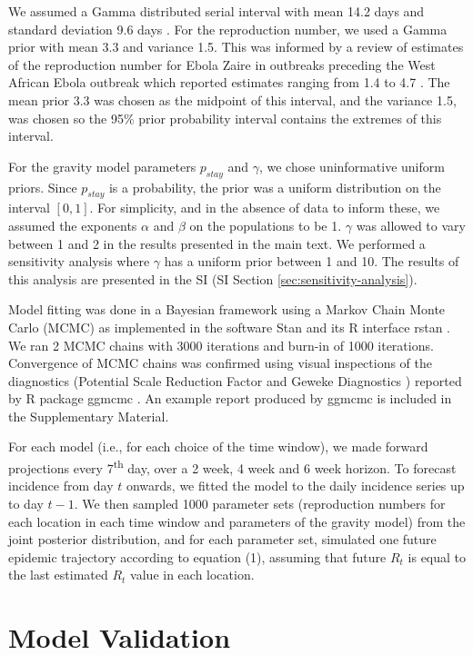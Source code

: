 \documentclass[9pt,twocolumn,twoside,lineno]{pnas-new}
\begin{document}
{We assumed a Gamma distributed serial interval with mean 14.2 days and
standard deviation 9.6 days \cite{team2015west}. For the reproduction
number, we used a Gamma prior with mean 3.3 and variance 1.5. This was
informed by a review of estimates of the reproduction number for Ebola
Zaire in outbreaks preceding the West African Ebola outbreak which
reported estimates ranging from 1.4 to 4.7 \cite{van2015review}. The
mean prior 3.3 was chosen as the midpoint of this interval, and the
variance 1.5, was chosen so the 95\% prior probability interval contains
the extremes of this interval.

For the gravity model parameters \(p_{stay}\) and \(\gamma\), we chose
uninformative uniform priors. Since \(p_{stay}\) is a probability, the
prior was a uniform distribution on the interval \([0, 1]\). For
simplicity, and in the absence of data to inform these, we assumed the
exponents \(\alpha\) and \(\beta\) on the populations to be 1.
\(\gamma\) was allowed to vary between 1 and 2 in the results presented
in the main text. We performed a sensitivity analysis where \(\gamma\)
has a uniform prior between 1 and 10. The results of this analysis are
presented in the SI (SI Section \ref{sec:sensitivity-analysis}).

Model fitting was done in a Bayesian framework using a Markov Chain
Monte Carlo (MCMC) as implemented in the software Stan
\cite{carpenter2017stan} and its R interface rstan \cite{rstan}. We ran
2 MCMC chains with 3000 iterations and burn-in of 1000 iterations.
Convergence of MCMC chains was confirmed using visual inspections of the
diagnostics (Potential Scale Reduction Factor \cite{gelman1992inference}
and Geweke Diagnostics \cite{geweke}) reported by R package ggmcmc
\cite{ggmcmc}. An example report produced by ggmcmc is included in the
Supplementary Material.

For each model (i.e., for each choice of the time window), we made
forward projections every 7\textsuperscript{th} day, over a 2 week, 4
week and 6 week horizon. To forecast incidence from day \(t\) onwards,
we fitted the model to the daily incidence series up to day \(t-1\). We
then sampled 1000 parameter sets (reproduction numbers for each location
in each time window and parameters of the gravity model) from the joint
posterior distribution, and for each parameter set, simulated one future
epidemic trajectory according to equation (1), assuming that future
\(R_t\) is equal to the last estimated \(R_t\) value in each location.

\section*{Model Validation}\label{assess}

}
\end{document}
